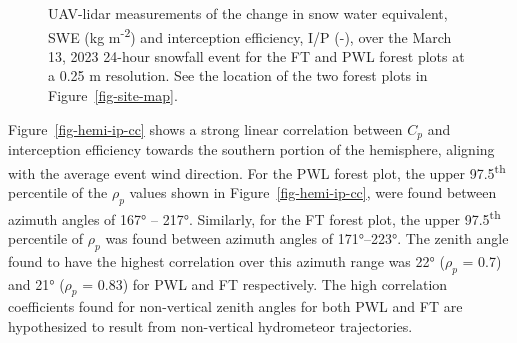 \documentclass[
  letterpaper,
  DIV=11,
  numbers=noendperiod]{scrartcl}
\begin{document}
\begin{figure}


\caption{\label{fig-lidar-tf-ip}UAV-lidar measurements of the change in
snow water equivalent, SWE (kg m\textsuperscript{-2}) and interception
efficiency, I/P (-), over the March 13, 2023 24-hour snowfall event for
the FT and PWL forest plots at a 0.25 m resolution. See the location of
the two forest plots in Figure~\ref{fig-site-map}.}

\end{figure}%

Figure~\ref{fig-hemi-ip-cc} shows a strong linear correlation between
\(C_p\) and interception efficiency towards the southern portion of the
hemisphere, aligning with the average event wind direction. For the PWL
forest plot, the upper 97.5\textsuperscript{th} percentile of the
\(\rho_p\) values shown in Figure~\ref{fig-hemi-ip-cc}, were found
between azimuth angles of 167° -- 217°. Similarly, for the FT forest
plot, the upper 97.5\textsuperscript{th} percentile of \(\rho_p\) was
found between azimuth angles of 171°--223°. The zenith angle found to
have the highest correlation over this azimuth range was 22° (\(\rho_p\)
= 0.7) and 21° (\(\rho_p\) = 0.83) for PWL and FT respectively. The high
correlation coefficients found for non-vertical zenith angles for both
PWL and FT are hypothesized to result from non-vertical hydrometeor
trajectories.
\end{document}
